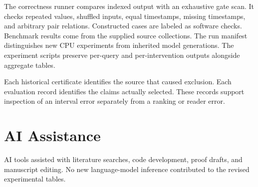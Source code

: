 The correctness runner compares indexed output with an exhaustive gate scan.
It checks repeated values, shuffled inputs, equal timestamps, missing timestamps, and arbitrary pair relations.
Constructed cases are labeled as software checks.
Benchmark results come from the supplied source collections.
The run manifest distinguishes new CPU experiments from inherited model generations.
The experiment scripts preserve per-query and per-intervention outputs alongside aggregate tables.

Each historical certificate identifies the source that caused exclusion.
Each evaluation record identifies the claims actually selected.
These records support inspection of an interval error separately from a ranking or reader error.

\section{AI Assistance}
AI tools assisted with literature searches, code development, proof drafts, and manuscript editing.
No new language-model inference contributed to the revised experimental tables.
